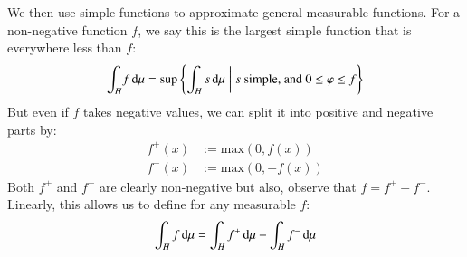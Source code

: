 We then use simple functions to approximate general measurable functions.
For a non-negative function $f$, we say this is the largest simple function that is everywhere less than $f$:
\begin{equation}
	\int_H \! f \mathop{}\!\mathrm{d}\mu = 
		\text{sup} \left\{ 
			\int_H s \mathop{}\!\mathrm{d} \mu \;\middle|\; s \text{ simple, and } 0 \leq \varphi \leq f 
		\right\}
\end{equation}
But even if $f$ takes negative values, we can split it into positive and negative parts by:
\begin{align}
f^+(x) &:= \mathrm{max}( 0, f(x)) \\
f^-(x) &:= \mathrm{max}(0, -f(x)) 
\end{align}
Both $f^+$ and $f^-$ are clearly non-negative but also, observe that $f=f^+ - f^-$.
Linearly, this allows us to define for any measurable $f$:
\begin{equation}
\int_H f \mathop{}\!\mathrm{d} \mu = \int_H f^+ \mathop{}\!\mathrm{d} \mu - \int_H f^- \mathop{}\!\mathrm{d} \mu
\end{equation}


